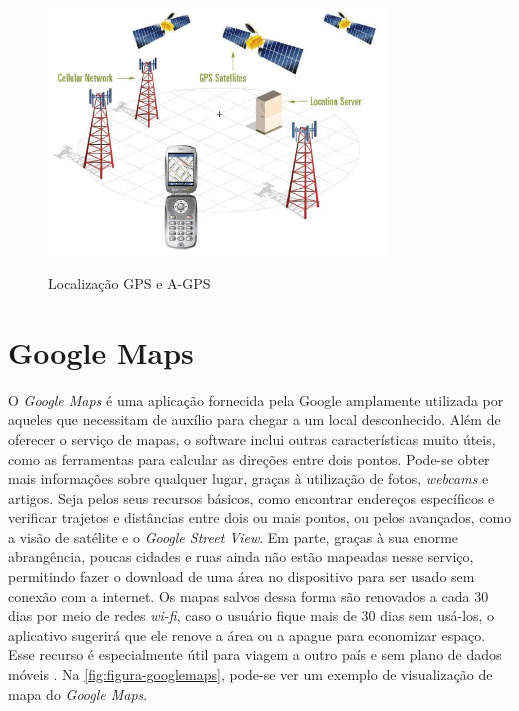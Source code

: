 \begin{figure}[H]
    \centering
    \caption{Localização GPS e A-GPS}
    \includegraphics[width=0.8\textwidth]{./dados/figuras/fig5}
    \label{fig:figura-localizacaoGpsAgps}
\end{figure}

\section{Google Maps}

O \textit{Google Maps} é uma aplicação fornecida pela Google amplamente utilizada por aqueles que necessitam de auxílio para chegar a um local desconhecido. Além de oferecer o serviço de mapas, o software inclui outras características muito úteis, como as ferramentas para calcular as direções entre dois pontos. Pode-se obter mais informações sobre qualquer lugar, graças à utilização de fotos, \textit{webcams} e artigos. Seja pelos seus recursos básicos, como encontrar endereços específicos e verificar trajetos e distâncias entre dois ou mais pontos, ou pelos avançados, como a visão de satélite e o \textit{Google Street View}. Em parte, graças à sua enorme abrangência, poucas cidades e ruas ainda não estão mapeadas nesse serviço, permitindo fazer o download de uma área no dispositivo para ser usado sem conexão com a internet. Os mapas salvos dessa forma são renovados a cada 30 dias por meio de redes \textit{wi-fi}, caso o usuário fique mais de 30 dias sem usá-los, o aplicativo sugerirá que ele renove a área ou a apague para economizar espaço. Esse recurso é especialmente útil para viagem a outro país e sem plano de dados móveis \cite{google:2019}. Na \autoref{fig:figura-googlemaps}, pode-se ver um exemplo de visualização de mapa do \textit{Google Maps}.

